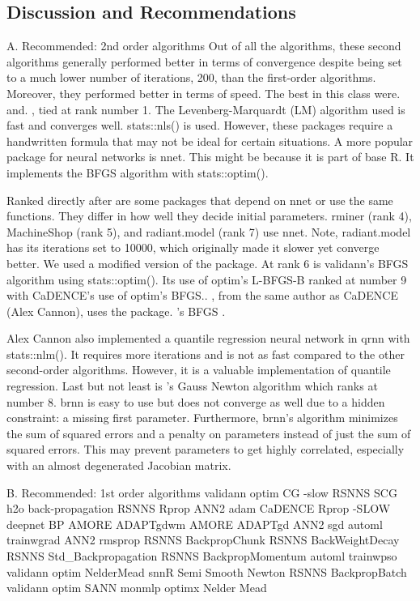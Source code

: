 \hypertarget{discussion-and-recommendations}{%
\subsection{Discussion and
Recommendations}\label{discussion-and-recommendations}}

A. Recommended: 2nd order algorithms Out of all the algorithms, these
second algorithms generally performed better in terms of convergence
despite being set to a much lower number of iterations, 200, than the
first-order algorithms. Moreover, they performed better in terms of
speed. The best in this class were.  and.
, tied at rank number 1. The Levenberg-Marquardt (LM)
algorithm used is fast and converges well. stats::nls() is used.
However, these packages require a handwritten formula that may not be
ideal for certain situations. A more popular package for neural networks
is nnet. This might be because it is part of base R. It implements the
BFGS algorithm with stats::optim().

Ranked directly after are some packages that depend on nnet or use the
same functions. They differ in how well they decide initial parameters.
rminer (rank 4), MachineShop (rank 5), and radiant.model (rank 7) use
nnet. Note, radiant.model has its iterations set to 10000, which
originally made it slower yet converge better. We used a modified
version of the package. At rank 6 is validann's BFGS algorithm using
stats::optim(). Its use of optim's L-BFGS-B ranked at number 9 with
CaDENCE's use of optim's BFGS.. , from the same author
as CaDENCE (Alex Cannon), uses the package. 's BFGS
\citep{R-optimx}.

Alex Cannon also implemented a quantile regression neural network in
qrnn with stats::nlm(). It requires more iterations and is not as fast
compared to the other second-order algorithms. However, it is a valuable
implementation of quantile regression. Last but not least is
's Gauss Newton algorithm which ranks at number 8. brnn is
easy to use but does not converge as well due to a hidden constraint: a
missing first parameter. Furthermore, brnn's algorithm minimizes the sum
of squared errors and a penalty on parameters instead of just the sum of
squared errors. This may prevent parameters to get highly correlated,
especially with an almost degenerated Jacobian matrix.

B. Recommended: 1st order algorithms validann optim CG -slow RSNNS SCG
h2o back-propagation RSNNS Rprop ANN2 adam CaDENCE Rprop -SLOW deepnet
BP AMORE ADAPTgdwm AMORE ADAPTgd ANN2 sgd automl trainwgrad ANN2 rmsprop
RSNNS BackpropChunk RSNNS BackWeightDecay RSNNS Std\_Backpropagation
RSNNS BackpropMomentum automl trainwpso validann optim NelderMead snnR
Semi Smooth Newton RSNNS BackpropBatch validann optim SANN monmlp optimx
Nelder Mead

